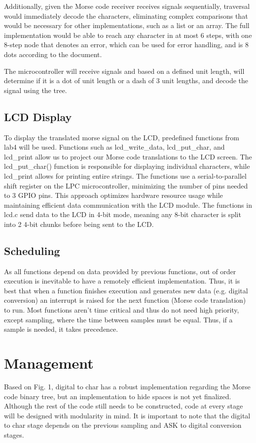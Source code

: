 \documentclass{cce2014-design}
\begin{document}
Additionally, given the Morse code receiver receives signals sequentially, traversal would immediately decode the characters, eliminating complex comparisons that would be necessary for other implementations, such as a list or an array. The full implementation would be able to reach any character in at most 6 steps, with one 8-step node that denotes an error, which can be used for error handling, and is 8 dots according to the document.

The microcontroller will receive signals and based on a defined unit length, will determine if it is a dot of unit length or a dash of 3 unit lengths, and decode the signal using the tree.
\subsection{LCD Display}
To display the translated morse signal on the LCD, predefined functions from lab4 will be used. Functions such as lcd\_write\_data, lcd\_put\_char, and lcd\_print allow us to project our Morse code translations to the LCD screen. The lcd\_put\_char() function is responsible for displaying individual characters, while lcd\_print allows for printing entire strings. The functions use a serial-to-parallel shift register on the LPC microcontroller, minimizing the number of pins needed to 3 GPIO pins. This approach optimizes hardware resource usage while maintaining efficient data communication with the LCD module. The functions in lcd.c send data to the LCD in 4-bit mode, meaning any 8-bit character is split into 2 4-bit chunks before being sent to the LCD. 

\subsection{Scheduling}

As all functions depend on data provided by previous functions, out of order execution is inevitable to have a remotely efficient implementation. Thus, it is best that when a function finishes execution and generates new data (e.g. digital conversion) an interrupt is raised for the next function (Morse code translation) to run. Most functions aren’t time critical and thus do not need high priority, except sampling, where the time between samples must be equal. Thus, if a sample is needed, it takes precedence.

\section{Management}
Based on Fig. 1, digital to char has a robust implementation regarding the Morse code binary tree, but an implementation to hide spaces is not yet finalized. Although the rest of the code still needs to be constructed, code at every stage will be designed with modularity in mind. It is important to note that the digital to char stage depends on the previous sampling and ASK to digital conversion stages. 
\end{document}
